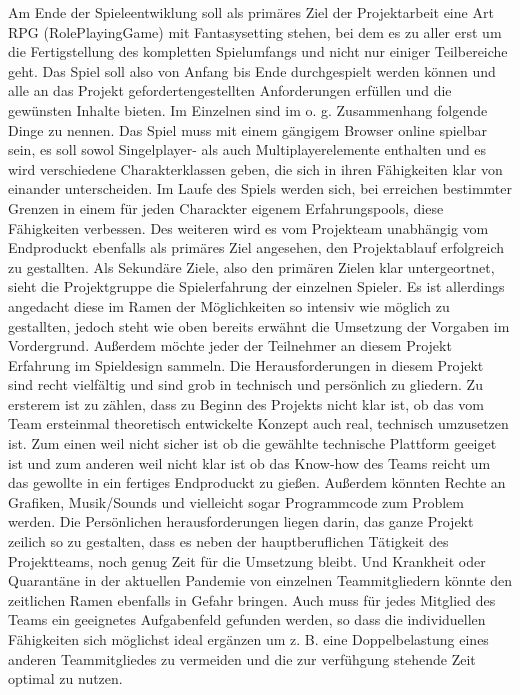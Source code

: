 Am Ende der Spieleentwiklung soll als primäres Ziel der Projektarbeit eine Art RPG (RolePlayingGame) mit Fantasysetting stehen, bei dem es zu aller erst um die Fertigstellung des kompletten Spielumfangs und nicht nur einiger Teilbereiche geht. Das Spiel soll also von Anfang bis Ende durchgespielt werden können und alle an das Projekt gefordertengestellten Anforderungen erfüllen und die gewünsten Inhalte bieten. Im Einzelnen sind im o. g. Zusammenhang folgende Dinge zu nennen. Das Spiel muss mit einem gängigem Browser online spielbar sein, es soll sowol Singelplayer- als auch Multiplayerelemente enthalten und es wird verschiedene Charakterklassen geben, die sich in ihren Fähigkeiten klar von einander unterscheiden. Im Laufe des Spiels werden sich, bei erreichen bestimmter Grenzen in einem für jeden Charackter eigenem Erfahrungspools, diese Fähigkeiten verbessen. Des weiteren wird es vom Projekteam unabhängig vom Endproduckt ebenfalls als primäres Ziel angesehen, den Projektablauf erfolgreich zu gestallten.
Als Sekundäre Ziele, also den primären Zielen klar untergeortnet, sieht die Projektgruppe die Spielerfahrung der einzelnen Spieler. Es ist allerdings angedacht diese im Ramen der Möglichkeiten so intensiv wie möglich zu gestallten, jedoch steht wie oben bereits erwähnt die Umsetzung der Vorgaben im Vordergrund. Außerdem möchte jeder der Teilnehmer an diesem Projekt Erfahrung im Spieldesign sammeln.
Die Herausforderungen in diesem Projekt sind recht vielfältig und sind grob in technisch und persönlich zu gliedern. Zu ersterem ist zu zählen, dass zu Beginn des Projekts nicht klar ist, ob das vom Team ersteinmal theoretisch entwickelte Konzept auch real, technisch umzusetzen ist. Zum einen weil nicht sicher ist ob die gewählte technische Plattform geeiget ist und zum anderen weil nicht klar ist ob das Know-how des Teams reicht um das gewollte in ein fertiges Endproduckt zu gießen. Außerdem könnten Rechte an Grafiken, Musik/Sounds und vielleicht sogar Programmcode zum Problem werden. Die Persönlichen herausforderungen liegen darin, das ganze Projekt zeilich so zu gestalten, dass es neben der hauptberuflichen Tätigkeit des Projektteams, noch genug Zeit für die Umsetzung bleibt. Und Krankheit oder Quarantäne in der aktuellen Pandemie von einzelnen Teammitgliedern könnte den zeitlichen Ramen ebenfalls in Gefahr bringen. Auch muss für jedes Mitglied des Teams ein geeignetes Aufgabenfeld gefunden werden, so dass die individuellen Fähigkeiten sich möglichst ideal ergänzen um z. B. eine Doppelbelastung eines anderen Teammitgliedes zu vermeiden und die zur verfühgung stehende Zeit optimal zu nutzen. 



